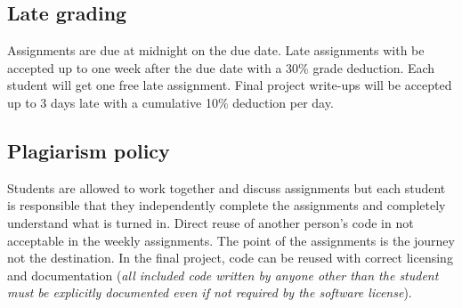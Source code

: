 \documentclass[12pt]{article}
\begin{document}
\subsection*{Late grading}
Assignments are due at midnight on the due date. Late assignments with be accepted up to one week after the due date with a 30\% grade deduction. Each student will get one free late assignment. Final project write-ups will be accepted up to 3 days late with a cumulative 10\% deduction per day.

\subsection*{Plagiarism policy}
Students are allowed to work together and discuss assignments but each student is responsible that they independently complete the assignments and completely understand what is turned in. Direct reuse of another person's code in not acceptable in the weekly assignments. The point of the assignments is the journey not the destination. In the final project, code can be reused with correct licensing and documentation (\emph{all included code written by anyone other than the student must be explicitly documented even if not required by the software license}).
\end{document}
